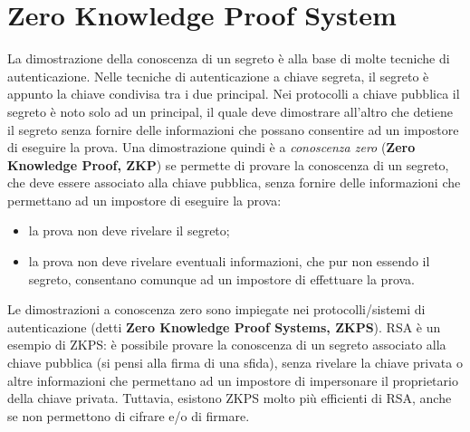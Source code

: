 \section{Zero Knowledge Proof System}

La dimostrazione della conoscenza di un segreto è alla base di molte tecniche di autenticazione. Nelle tecniche di autenticazione a chiave segreta, il segreto è appunto la chiave condivisa tra i due principal. Nei protocolli a chiave pubblica il segreto è noto solo ad un principal, il quale deve dimostrare all'altro che detiene il segreto senza fornire delle informazioni che possano consentire ad un impostore di eseguire la prova. 
\newline \newline
Una dimostrazione quindi è a \textit{conoscenza zero} (\textbf{Zero Knowledge Proof, ZKP}) se permette di provare la conoscenza di un segreto, che deve essere associato alla chiave pubblica, senza fornire delle informazioni che permettano ad un impostore di eseguire la prova: 
\begin{itemize}
\item la prova non deve rivelare il segreto;
\item la prova non deve rivelare eventuali informazioni, che pur non essendo il segreto, consentano comunque ad un impostore di effettuare la prova.
\end{itemize}
Le dimostrazioni a conoscenza zero sono impiegate nei protocolli/sistemi di autenticazione (detti \textbf{Zero Knowledge Proof Systems, ZKPS}). RSA è un esempio di ZKPS: è possibile provare la conoscenza di un segreto associato alla chiave pubblica (si pensi alla firma di una sfida), senza rivelare la chiave privata o altre informazioni che permettano ad un impostore di impersonare il proprietario della chiave privata. Tuttavia, esistono ZKPS molto più efficienti di RSA, anche se non permettono di cifrare e/o di firmare. 

